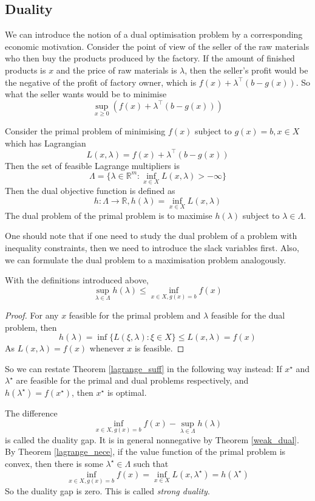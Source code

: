 \subsection{Duality}
We can introduce the notion of a dual optimisation problem by a corresponding economic motivation.
Consider the point of view of the seller of the raw materials who then buy the products produced by the factory.
If the amount of finished products is $x$ and the price of raw materials is $\lambda$, then the seller's profit would be the negative of the profit of factory owner, which is $f(x)+\lambda^\top(b-g(x))$.
So what the seller wants would be to minimise
$$\sup_{x\ge 0}(f(x)+\lambda^\top(b-g(x)))$$
\begin{definition}
    Consider the primal problem of minimising $f(x)$ subject to $g(x)=b,x\in X$ which has Lagrangian
    $$L(x,\lambda)=f(x)+\lambda^\top(b-g(x))$$
    Then the set of feasible Lagrange multipliers is
    $$\Lambda=\{\lambda\in\mathbb R^m:\inf_{x\in X}L(x,\lambda)>-\infty\}$$
    Then the dual objective function is defined as
    $$h:\Lambda\to\mathbb R,h(\lambda)=\inf_{x\in X}L(x,\lambda)$$
    The dual problem of the primal problem is to maximise $h(\lambda)$ subject to $\lambda\in\Lambda$.
\end{definition}
\begin{remark}
    One should note that if one need to study the dual problem of a problem with inequality constraints, then we need to introduce the slack variables first.
    Also, we can formulate the dual problem to a maximisation problem analogously.
\end{remark}
\begin{theorem}\label{weak_dual}
    With the definitions introduced above,
    $$\sup_{\lambda\in\Lambda} h(\lambda)\le\inf_{x\in X,g(x)=b}f(x)$$
\end{theorem}
\begin{proof}
    For any $x$ feasible for the primal problem and $\lambda$ feasible for the dual problem, then
    $$h(\lambda)=\inf\{L(\xi,\lambda):\xi\in X\}\le L(x,\lambda)=f(x)$$
    As $L(x,\lambda)=f(x)$ whenever $x$ is feasible.
\end{proof}
So we can restate Theorem \ref{lagrange_suff} in the following way instead:
If $x^\star$ and $\lambda^\star$ are feasible for the primal and dual problems respectively, and $h(\lambda^\star)=f(x^\star)$, then $x^\star$ is optimal.
\begin{remark}
    The difference
    $$\inf_{x\in X,g(x)=b}f(x)-\sup_{\lambda\in\Lambda}h(\lambda)$$
    is called the duality gap.
    It is in general nonnegative by Theorem \ref{weak_dual}.
    By Theorem \ref{lagrange_nece}, if the value function of the primal problem is convex, then there is some $\lambda^\star\in\Lambda$ such that
    $$\inf_{x\in X,g(x)=b}f(x)=\inf_{x\in X}L(x,\lambda^\star)=h(\lambda^\star)$$
    So the duality gap is zero.
    This is called \textit{strong duality}.
\end{remark}
